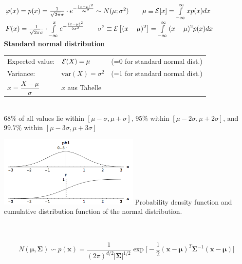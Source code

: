   \begin{minipage}{11.5cm}
  $\varphi(x)=p(x)=\frac{1}{\sqrt{2
  \pi}\sigma}\cdot e^{-\frac{(x-\mu)^2}{2\sigma^2}} \sim N(\mu ; \sigma^2) \qquad \mu \equiv \operatorname{\mathcal{E}}[x]=\int\limits_{-\infty}^{\infty}{x p(x) dx}$\\ 
  $F(x)=\frac{1}{\sqrt{2
  \pi}\sigma}\cdot \int\limits^{x}_{-\infty}{e^{-\frac{(\tilde{x} -\mu)^2}{2\sigma^2}}} \qquad \sigma^2 \equiv \operatorname{\mathcal{E}}\left[(x-\mu)^2\right]=\int\limits_{-\infty}^{\infty}{(x-\mu)^2 p(x) dx}$ \\
  
  \textbf{Standard normal distribution}\\
  
  \begin{tabular}{lll}
      Expected value: & $\operatorname{\mathcal{E}}(X)=\mu$ & (=0 for standard normal dist.)\\ 
      Variance: & $\mathrm{var}(X)=\sigma^2$ & (=1 for standard normal dist.)\\
      $x=\dfrac{X-\mu}{\sigma}$ & $x$ aus Tabelle & \\
  \end{tabular} \\
  $ 68\% $ of all values lie within $[ \mu - \sigma, \mu + \sigma]$,
  $ 95\% $ within $[ \mu - 2\sigma, \mu + 2\sigma]$, and 
   $99.7\% $ within $[ \mu - 3\sigma, \mu + 3\sigma]$
  \end{minipage}\hspace{0.5cm}
  \begin{minipage}{7cm}
  \includegraphics[width=7cm]{images/normalverteilung.png}
  Probability density function and cumulative distribution function of the normal distribution. 
  \end{minipage} \\ \\

  \begin{equation*}
      N(\boldsymbol{\mu}, \boldsymbol{\Sigma}) \backsim p(\mathbf{x}) = \frac{1}{(2\pi)^{d/2} | \boldsymbol{\Sigma}|^{1/2}} \exp \bigg[-\frac{1}{2} (\mathbf{x} - \boldsymbol{\mu})^T \boldsymbol{\Sigma}^{-1} (\mathbf{x}-\boldsymbol{\mu})\bigg]
  \end{equation*}

